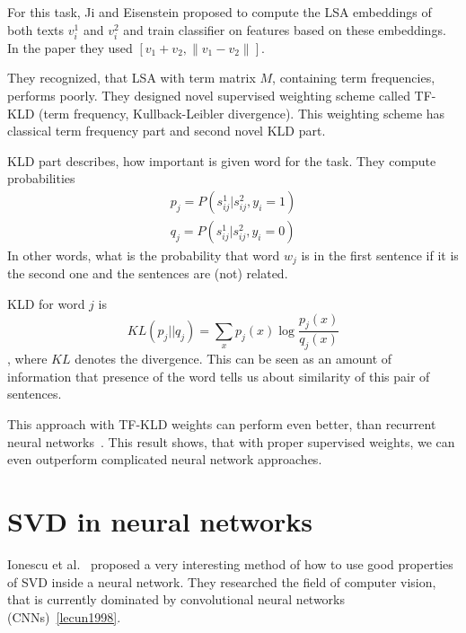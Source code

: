         For this task, Ji and Eisenstein proposed to compute the LSA embeddings of both texts $v_i^1$ and $v_i^2$ and train classifier on features based on these embeddings.
        In the paper they used $[v_1 + v_2, \| v_1- v_2 \|]$.
        
        They recognized, that LSA with term matrix $M$, containing term frequencies, performs poorly. 
        They designed novel supervised weighting scheme called TF-KLD (term frequency, Kullback-Leibler divergence). 
        This weighting scheme has classical term frequency part and second novel KLD part.
        
        KLD part describes, how important is given word for the task.
        They compute probabilities 
        \begin{equation}
        \begin{split}
        p_j = P(s_{ij}^1| s_{ij}^2, y_i=1) \\
        q_j = P(s_{ij}^1| s_{ij}^2, y_i=0)   
        \end{split}
        \end{equation}
        In other words, what is the probability that word $w_j$ is in the first sentence if it is the second one and the sentences are (not) related.
        
        KLD for word $j$ is 
        \begin{equation}
        KL(p_j || q_j) = \sum_x p_j(x) \log \frac{p_j(x)}{q_j(x)}
        \end{equation},
         where $KL$ denotes the  divergence.
        This can be seen as an amount of information that presence of the word tells us about similarity of this pair of sentences. 
    
        This approach with TF-KLD weights can perform even better, than recurrent neural networks~\cite{conneau2017supervised}.
        This result shows, that with proper supervised weights, we can even outperform complicated neural network approaches.
        

\section{SVD in neural networks} \label{sec:nn:svd}
    Ionescu et al.~\cite{ionescu2015training} %
    proposed a very interesting method of how to use good properties of SVD inside a neural network.
    They researched the field of computer vision, that is currently dominated by convolutional neural networks (CNNs)~\ref{lecun1998}.
    
